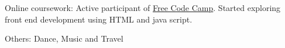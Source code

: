 
\inlineheadsection
  {Online coursework:}
  {Active participant of \href{https://www.freecodecamp.com}{Free Code Camp}. Started exploring front end development using HTML and java script.}

\vspace{0.5em}

\inlineheadsection
  {Others:}
  {Dance, Music and Travel}